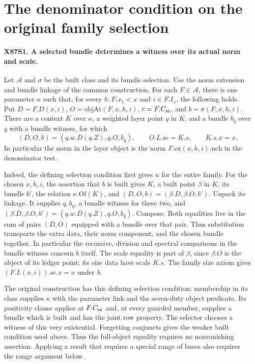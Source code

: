 \section{The denominator condition on the original family selection}

\paragraph{X87S1. A selected bundle determines a witness over its actual norm and scale.}
Let $\mathcal A$ and $\sigma$ be the built class and its bundle selection.
Use the norm extension and bundle linkage of the common construction.
For each $F\in\mathcal A$, there is one parameter $\kappa$ such that,
for every $h:F.x_1<x$ and $i\in F.I_x$, the following holds.
Put $D=F.D(x,i)$, $O=\mathrm{objAt}(F,x,h,i)$, $c=F.C_{\rm sz}$,
and $b=\sigma(F,x,h,i)$. There are a context $K$ over $\kappa$,
a weighted layer point $q$ in $K$, and a bundle $b_q$ over $q$
with a bundle witness, for which
\[
 (D,O,b)=(q.w.D(q.Z),q.O,b_q),\qquad
 O.L.\mathrm{sc}=K.s,\qquad K.s.x=x .
\]
In particular the norm in the layer object is the norm
$F.\mathrm{ex}(x,h,i).\mathrm{nch}$ in the denominator test.

Indeed, the defining selection condition first gives $\kappa$ for
the entire family. For the chosen $x,h,i$, the assertion that $b$
is built gives $K$, a built point $\beta$ in $K$, its bundle $b'$,
the relation $\kappa.\mathrm{Of}(K)$, and
$(D,O,b)=(\beta.D,\beta.O,b')$. Unpack its linkage. It supplies
$q,b_q$, a bundle witness for these two, and
$(\beta.D,\beta.O,b')=(q.w.D(q.Z),q.O,b_q)$. Compose.
Both equalities live in the sum of pairs $(D,O)$ equipped with a
bundle over that pair. Thus substitution transports the extra data,
their norm component, and the chosen bundle together. In particular
the recursive, division and spectral comparisons in the bundle
witness concern $b$ itself. The scale equality is part of $\beta$,
since $\beta.O$ is the object of its ledger point; its size data
have scale $K.s$. The family size axiom gives
$(F.L(x,i)).\mathrm{sc}.x=x$ under $h$.

The original construction has this defining selection condition:
membership in its class supplies $\kappa$ with the parameter link
and the seven-duty object predicate. Its positivity clause applies
at $F.C_{\rm sz}$ and, at every guarded member, supplies a bundle
which is built and has the joint row property. The selector chooses
a witness of this very existential. Forgetting conjuncts gives the
weaker built condition used above. Thus the full-object equality
requires no nonvanishing assertion. Applying a result that requires
a special range of bases also requires the range argument below.


